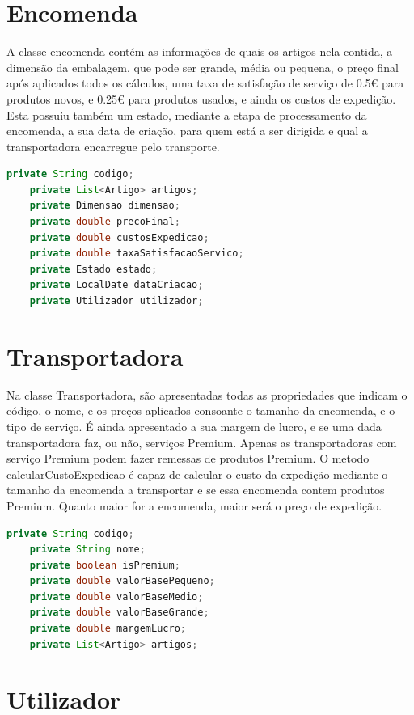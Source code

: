 \documentclass[a4paper]{report}
\begin{document}
    \section{Encomenda}
    
    A classe encomenda contém as informações de quais os artigos nela contida, a dimensão da embalagem, que pode ser grande, média ou pequena, o preço final após aplicados todos os cálculos, uma taxa de satisfação de serviço de 0.5€ para produtos novos, e 0.25€ para produtos usados, e ainda os custos de expedição.
    Esta  possuiu também um estado, mediante a etapa de processamento da encomenda, a sua data de criação, para quem está a ser dirigida e qual a transportadora encarregue pelo transporte.
    
    \begin{lstlisting}[language=java]
    private String codigo;
    private List<Artigo> artigos;
    private Dimensao dimensao;
    private double precoFinal;
    private double custosExpedicao;
    private double taxaSatisfacaoServico;
    private Estado estado;
    private LocalDate dataCriacao;
    private Utilizador utilizador;
    \end{lstlisting}


    \section{Transportadora}
    
    Na classe Transportadora, são apresentadas todas as propriedades que indicam o código, o nome, e os preços aplicados consoante o tamanho da encomenda, e o tipo de serviço. É ainda apresentado a sua margem de lucro, e se uma dada transportadora faz, ou não, serviços Premium. Apenas as transportadoras com serviço Premium podem fazer remessas de produtos Premium. O metodo calcularCustoExpedicao é capaz de calcular o custo da expedição mediante o tamanho da encomenda a transportar e se essa encomenda contem produtos Premium. Quanto maior for a encomenda, maior será o preço de expedição.
    
    
    \begin{lstlisting}[language=java]
    private String codigo;
    private String nome;
    private boolean isPremium;
    private double valorBasePequeno;
    private double valorBaseMedio;
    private double valorBaseGrande;
    private double margemLucro;
    private List<Artigo> artigos;
    \end{lstlisting}

    
    \section{Utilizador}
\end{document}

